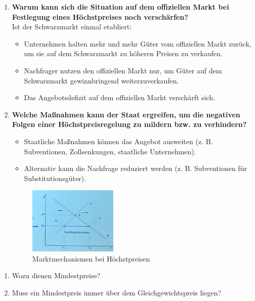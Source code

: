 {\begin{enumerate}[label=(\alph*)]
    \item \textbf{Warum kann sich die Situation auf dem offiziellen Markt bei Festlegung eines Höchstpreises noch verschärfen?}\\
    Ist der Schwarzmarkt einmal etabliert:
    \begin{itemize}
        \item Unternehmen halten mehr und mehr Güter vom offiziellen Markt zurück, um sie auf dem Schwarzmarkt zu höheren Preisen zu verkaufen.
        \item Nachfrager nutzen den offiziellen Markt nur, um Güter auf dem Schwarzmarkt gewinnbringend weiterzuverkaufen.
        \item Das Angebotsdefizit auf dem offiziellen Markt verschärft sich.
    \end{itemize}

    \item \textbf{Welche Maßnahmen kann der Staat ergreifen, um die negativen Folgen einer Höchstpreisregelung zu mildern bzw. zu verhindern?}\\
    \begin{itemize}
        \item Staatliche Maßnahmen können das Angebot ausweiten (z. B. Subventionen, Zollsenkungen, staatliche Unternehmen).
        \item Alternativ kann die Nachfrage reduziert werden (z. B. Subventionen für Substitutionsgüter).
    \end{itemize}
    \begin{figure}[H]
        \centering
        \includegraphics[width=0.4\textwidth]{figures/7_2.png}
        \caption{Marktmechanismen bei Höchstpreisen}
    \end{figure}
\end{enumerate}
}
\begin{enumerate}[label=(\alph*)]
    \item Wozu dienen Mindestpreise?
    \item Muss ein Mindestpreis immer über dem Gleichgewichtspreis liegen?
\end{enumerate}

